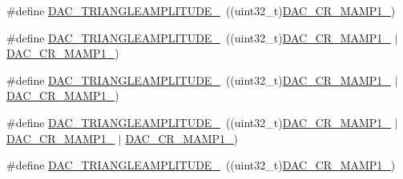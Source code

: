 \begin{DoxyCompactItemize}
\item 
\#define \mbox{\hyperlink{group___d_a_c_ex__lfsrunmask__triangleamplitude_ga900e918a12aa0542e8ba9ab6fe821f53}{D\+A\+C\+\_\+\+T\+R\+I\+A\+N\+G\+L\+E\+A\+M\+P\+L\+I\+T\+U\+D\+E\+\_}}~((uint32\+\_\+t)\mbox{\hyperlink{group___peripheral___registers___bits___definition_ga0fefef1d798a2685b03e44bd9fdac06b}{D\+A\+C\+\_\+\+C\+R\+\_\+\+M\+A\+M\+P1\+\_}})
\item 
\#define \mbox{\hyperlink{group___d_a_c_ex__lfsrunmask__triangleamplitude_gac6ef2005ddc7472e565ba021b37ef301}{D\+A\+C\+\_\+\+T\+R\+I\+A\+N\+G\+L\+E\+A\+M\+P\+L\+I\+T\+U\+D\+E\+\_}}~((uint32\+\_\+t)\mbox{\hyperlink{group___peripheral___registers___bits___definition_ga0fefef1d798a2685b03e44bd9fdac06b}{D\+A\+C\+\_\+\+C\+R\+\_\+\+M\+A\+M\+P1\+\_}} $\vert$ \mbox{\hyperlink{group___peripheral___registers___bits___definition_ga4225dcce22b440fcd3a8ad96c5f2baec}{D\+A\+C\+\_\+\+C\+R\+\_\+\+M\+A\+M\+P1\+\_}})
\item 
\#define \mbox{\hyperlink{group___d_a_c_ex__lfsrunmask__triangleamplitude_ga9592f254a8231d140002c513797a4010}{D\+A\+C\+\_\+\+T\+R\+I\+A\+N\+G\+L\+E\+A\+M\+P\+L\+I\+T\+U\+D\+E\+\_}}~((uint32\+\_\+t)\mbox{\hyperlink{group___peripheral___registers___bits___definition_ga0fefef1d798a2685b03e44bd9fdac06b}{D\+A\+C\+\_\+\+C\+R\+\_\+\+M\+A\+M\+P1\+\_}} $\vert$ \mbox{\hyperlink{group___peripheral___registers___bits___definition_ga6cc15817842cb7992d449c448684f68d}{D\+A\+C\+\_\+\+C\+R\+\_\+\+M\+A\+M\+P1\+\_}})
\item 
\#define \mbox{\hyperlink{group___d_a_c_ex__lfsrunmask__triangleamplitude_ga9b278ba3c4d0ff08f1a4f0477d66e975}{D\+A\+C\+\_\+\+T\+R\+I\+A\+N\+G\+L\+E\+A\+M\+P\+L\+I\+T\+U\+D\+E\+\_}}~((uint32\+\_\+t)\mbox{\hyperlink{group___peripheral___registers___bits___definition_ga0fefef1d798a2685b03e44bd9fdac06b}{D\+A\+C\+\_\+\+C\+R\+\_\+\+M\+A\+M\+P1\+\_}} $\vert$ \mbox{\hyperlink{group___peripheral___registers___bits___definition_ga6cc15817842cb7992d449c448684f68d}{D\+A\+C\+\_\+\+C\+R\+\_\+\+M\+A\+M\+P1\+\_}} $\vert$ \mbox{\hyperlink{group___peripheral___registers___bits___definition_ga4225dcce22b440fcd3a8ad96c5f2baec}{D\+A\+C\+\_\+\+C\+R\+\_\+\+M\+A\+M\+P1\+\_}})
\item 
\#define \mbox{\hyperlink{group___d_a_c_ex__lfsrunmask__triangleamplitude_ga5db79e666fa79f6a8699c276a57703e7}{D\+A\+C\+\_\+\+T\+R\+I\+A\+N\+G\+L\+E\+A\+M\+P\+L\+I\+T\+U\+D\+E\+\_}}~((uint32\+\_\+t)\mbox{\hyperlink{group___peripheral___registers___bits___definition_gafdc83b4feb742c632ba66f55d102432b}{D\+A\+C\+\_\+\+C\+R\+\_\+\+M\+A\+M\+P1\+\_}})

\end{DoxyCompactItemize}
